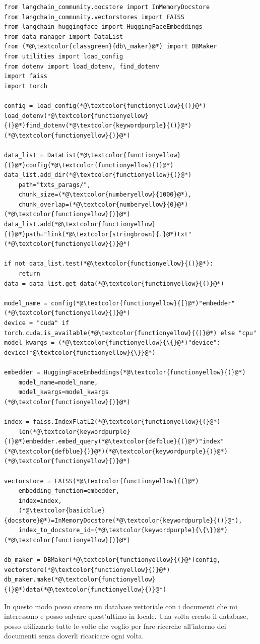 \begin{lstlisting}[label=lst:loaddb, caption={Procedura di caricamento con DB Maker}]
from langchain_community.docstore import InMemoryDocstore
from langchain_community.vectorstores import FAISS
from langchain_huggingface import HuggingFaceEmbeddings
from data_manager import DataList
from (*@\textcolor{classgreen}{db\_maker}@*) import DBMaker
from utilities import load_config
from dotenv import load_dotenv, find_dotenv
import faiss
import torch
 
config = load_config(*@\textcolor{functionyellow}{()}@*)
load_dotenv(*@\textcolor{functionyellow}{(}@*)find_dotenv(*@\textcolor{keywordpurple}{()}@*)(*@\textcolor{functionyellow}{)}@*)

data_list = DataList(*@\textcolor{functionyellow}{(}@*)config(*@\textcolor{functionyellow}{)}@*)
data_list.add_dir(*@\textcolor{functionyellow}{(}@*)
    path="txts_parags/",
    chunk_size=(*@\textcolor{numberyellow}{1000}@*),
    chunk_overlap=(*@\textcolor{numberyellow}{0}@*)
(*@\textcolor{functionyellow}{)}@*)
data_list.add(*@\textcolor{functionyellow}{(}@*)path="link(*@\textcolor{stringbrown}{.}@*)txt"(*@\textcolor{functionyellow}{)}@*)

if not data_list.test(*@\textcolor{functionyellow}{()}@*):
    return
data = data_list.get_data(*@\textcolor{functionyellow}{()}@*)

model_name = config(*@\textcolor{functionyellow}{[}@*)"embedder"(*@\textcolor{functionyellow}{]}@*)
device = "cuda" if torch.cuda.is_available(*@\textcolor{functionyellow}{()}@*) else "cpu"
model_kwargs = (*@\textcolor{functionyellow}{\{}@*)"device": device(*@\textcolor{functionyellow}{\}}@*)

embedder = HuggingFaceEmbeddings(*@\textcolor{functionyellow}{(}@*)
    model_name=model_name,
    model_kwargs=model_kwargs
(*@\textcolor{functionyellow}{)}@*)

index = faiss.IndexFlatL2(*@\textcolor{functionyellow}{(}@*)
    len(*@\textcolor{keywordpurple}{(}@*)embedder.embed_query(*@\textcolor{defblue}{(}@*)"index"(*@\textcolor{defblue}{)}@*)(*@\textcolor{keywordpurple}{)}@*)
(*@\textcolor{functionyellow}{)}@*)

vectorstore = FAISS(*@\textcolor{functionyellow}{(}@*)
    embedding_function=embedder,
    index=index,
    (*@\textcolor{basicblue}{docstore}@*)=InMemoryDocstore(*@\textcolor{keywordpurple}{()}@*),
    index_to_docstore_id=(*@\textcolor{keywordpurple}{\{\}}@*)
(*@\textcolor{functionyellow}{)}@*)

db_maker = DBMaker(*@\textcolor{functionyellow}{(}@*)config, vectorstore(*@\textcolor{functionyellow}{)}@*)
db_maker.make(*@\textcolor{functionyellow}{(}@*)data(*@\textcolor{functionyellow}{)}@*)
\end{lstlisting}
In questo modo posso creare un database vettoriale con i documenti che mi interessano e posso salvare quest'ultimo in locale. Una volta creato il database, posso utilizzarlo tutte le volte che voglio per fare ricerche all'interno dei documenti senza doverli ricaricare ogni volta.

